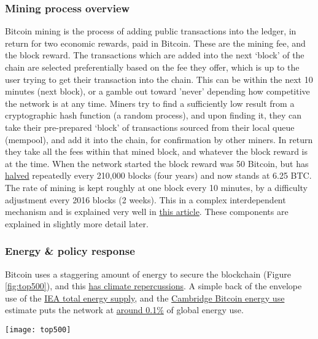 \subsubsection{Mining process overview}
Bitcoin mining is the process of adding public transactions into the ledger, in return for two economic rewards, paid in Bitcoin. These are the mining fee, and the block reward. The transactions which are added into the next `block' of the chain are selected preferentially based on the fee they offer, which is up to the user trying to get their transaction into the chain. This can be within the next 10 minutes (next block), or a gamble out toward 'never' depending how competitive the network is at any time. Miners try to find a sufficiently low result from a cryptographic hash function \cite{rogaway2004cryptographic}(a random process), and upon finding it, they can take their pre-prepared `block' of transactions sourced from their local queue (mempool), and add it into the chain, for confirmation by other miners. In return they take all the fees within that mined block, and whatever the block reward is at the time. When the network started the block reward was 50 Bitcoin, but has \href{https://ma.ttias.be/dissecting-code-bitcoin-halving/}{halved} repeatedly every 210,000 blocks (four years) and now stands at 6.25 BTC. The rate of mining is kept roughly at one block every 10 minutes, by a difficulty adjustment every 2016 blocks (2 weeks). This in a complex interdependent mechanism and is explained very well in \href{https://bitcoinmagazine.com/technical/how-mining-protects-the-bitcoin-network}{this article}. These components are explained in slightly more detail later.\par
\subsubsection{Energy \& policy response}
Bitcoin uses a staggering amount of energy to secure the blockchain (Figure \ref{fig:top500}), and this \href{https://www.edmundconway.com/bitcoin-money-and-the-planet/}{has climate repercussions}. A simple back of the envelope use of the \href{https://www.iea.org/reports/key-world-energy-statistics-2021/supply}{IEA total energy supply}, and the \href{https://ccaf.io/cbeci/index}{Cambridge Bitcoin energy use} estimate puts the network at \href{https://www.wolframalpha.com/input?i=153+terawatt+hours+as+percentage+of+\%28600+exa+joules+as+terrawatt+hours\%29+}{around 0.1\%} of global energy use.\par
\begin{figure*}[ht]\centering %
	\texttt{[image: top500]}
	\caption{\href{https://twitter.com/blockbain/status/1432824720727105539}{Bitcoin network vs TOP500 supercomputers}}
	\label{fig:top500}
\end{figure*}

